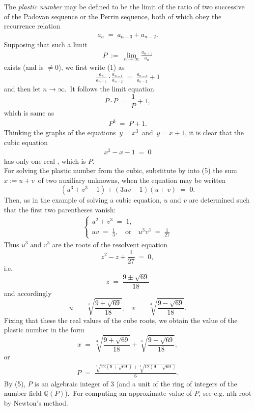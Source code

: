 \documentclass[12pt]{article}
\theoremstyle{definition}
\begin{document}
The \emph{plastic number} may be defined to be the limit of the ratio of two successive  of the Padovan sequence or the Perrin sequence, both of which obey the recurrence relation
\begin{align}
a_n \;=\; a_{n-3}+a_{n-2}.
\end{align}
Supposing that such a limit 
\begin{align}
P \;:=\; \lim_{n\to\infty}\frac{a_{n+1}}{a_n}
\end{align}
exists (and is $\neq 0$), we first write (1) as
\begin{align}
\frac{a_n}{a_{n-1}}\cdot\frac{a_{n-1}}{a_{n-2}} \;=\; \frac{a_{n-3}}{a_{n-2}}+1
\end{align}
and then let $n \to \infty$.\, It follows the limit equation
$$P\!\cdot\!P \;=\; \frac{1}{P}\!+\!1,$$
which is same as
\begin{align}
P^3 \;=\; P\!+\!1.
\end{align}
Thinking the graphs of the equations \,$y = x^3$\, and\, $y = x\!+\!1$, it is clear that the cubic equation
\begin{align}
x^3\!-\!x\!-\!1 \;=\; 0
\end{align}
has only one real , which is $P$.  \\

For solving the plastic number from the cubic, substitute by  into (5) the sum 
\,$x := u\!+\!v$\, of two auxiliary unknowns, when the equation may be written
$$(u^3\!+\!v^3\!-\!1)+(3uv\!-1)(u\!+\!v) \;=\; 0.$$
Then, as in the example of solving a cubic equation, $u$ and $v$ are determined such that the first two parentheses vanish:
\begin{align*}
\begin{cases}
u^2\!+\!v^3 \;=\; 1,\\
uv \;=\; \frac{1}{3}, \quad \mbox{or} \quad u^3v^3 \;=\; \frac{1}{27}
\end{cases}
\end{align*}
Thus $u^3$ and $v^3$ are the roots of the resolvent equation
$$z^2\!-\!z\!+\!\frac{1}{27} \;=\; 0,$$
i.e.
$$z \;=\;\frac{9\!\pm\!\sqrt{69}}{18}$$
and accordingly
$$u \;=\; \sqrt[3]{\frac{9\!+\!\sqrt{69}}{18}}, \quad v \;=\; \sqrt[3]{\frac{9\!-\!\sqrt{69}}{18}}.$$
Fixing that these  the real values of the cube roots, we obtain the value of the plastic number in the form
$$x \;=\; \sqrt[3]{\frac{9\!+\!\sqrt{69}}{18}}+\sqrt[3]{\frac{9\!-\!\sqrt{69}}{18}},$$
or
\begin{align}
P \;=\; \frac{ \sqrt[3]{12(9\!+\!\sqrt{69})}+\sqrt[3]{12(9\!-\!\sqrt{69})} } {6}.
\end{align}
By (5), $P$ is an algebraic integer of  3 (and a unit of the ring of integers of the number field $\mathbb{Q}(P)$).\, For computing an approximate value of $P$, see e.g. nth root by Newton's method.






\end{document}
